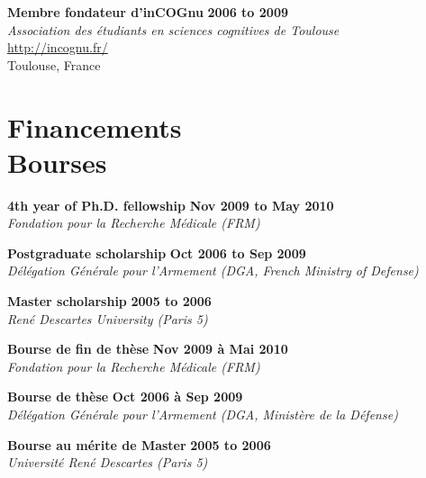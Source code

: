 \documentclass[margin,line]{resume}
\begin{document}
\begin{resume}
	\textbf{Membre fondateur d'inCOGnu} \hfill \textbf{2006 to 2009}\\
	\textsl{Association des étudiants en sciences cognitives de Toulouse}\\
	 \url{http://incognu.fr/}\\
	Toulouse, France


\vspace{3mm}
    \section{\mysidestyle Financements\\Bourses}



	
	\textbf{4th year of Ph.D. fellowship} \hfill \textbf{Nov 2009 to May 2010}\\
	\textsl{Fondation pour la Recherche Médicale (FRM)}

	\textbf{Postgraduate scholarship} \hfill \textbf{Oct 2006 to Sep 2009}\\ %
	\textsl{Délégation Générale pour l'Armement (DGA, French Ministry of Defense)}

	\textbf{Master scholarship} \hfill \textbf{2005 to 2006}\\
	\textsl{René Descartes University (Paris 5)}
	
	\textbf{Bourse de fin de thèse} \hfill \textbf{Nov 2009 à Mai 2010}\\
	\textsl{Fondation pour la Recherche Médicale (FRM)}
	
	\textbf{Bourse de thèse} \hfill \textbf{Oct 2006 à Sep 2009}\\ %
	\textsl{Délégation Générale pour l'Armement (DGA, Ministère de la Défense)}
	
	\textbf{Bourse au mérite  de Master} \hfill \textbf{2005 to 2006}\\
	\textsl{Université René Descartes (Paris 5)}



\end{resume}
\end{document}
